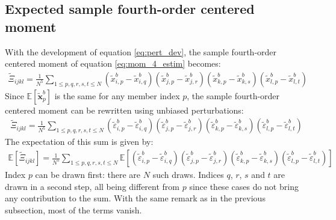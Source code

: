 \documentclass[12pt]{scrartcl}
\begin{document}
\subsection{Expected sample fourth-order centered moment}
With the development of equation \eqref{eq:pert_dev}, the sample fourth-order centered moment of equation \eqref{eq:mom_4_estim} becomes:
\begin{align}
\widetilde{\Xi}_{ijkl} = \frac{1}{N^5} \sum_{1 \le p,q,r,s,t \le N} \left(\widetilde{x}^b_{i,p} - \widetilde{x}^b_{i,q}\right) \left(\widetilde{x}^b_{j,p} - \widetilde{x}^b_{j,r}\right) \left(\widetilde{x}^b_{k,p} - \widetilde{x}^b_{k,s}\right) \left(\widetilde{x}^b_{l,p} - \widetilde{x}^b_{l,t}\right)
\end{align}
Since $\mathbb{E} \left[\widetilde{\mathbf{x}}^b_p\right]$ is the same for any member index $p$, the sample fourth-order centered moment can be rewritten using unbiased perturbations:
\begin{align}
\widetilde{\Xi}_{ijkl} = \frac{1}{N^5} \sum_{1 \le p,q,r,s,t \le N} \left(\widetilde{\varepsilon}^b_{i,p} - \widetilde{\varepsilon}^b_{i,q}\right) \left(\widetilde{\varepsilon}^b_{j,p} - \widetilde{\varepsilon}^b_{j,r}\right) \left(\widetilde{\varepsilon}^b_{k,p} - \widetilde{\varepsilon}^b_{k,s}\right) \left(\widetilde{\varepsilon}^b_{l,p} - \widetilde{\varepsilon}^b_{l,t}\right)
\end{align}
The expectation of this sum is given by:
\begin{align}
\mathbb{E} \left[\widetilde{\Xi}_{ijkl}\right] = \frac{1}{N^5} \sum_{1 \le p,q,r,s,t \le N} \mathbb{E} \left[\left(\widetilde{\varepsilon}^b_{i,p} - \widetilde{\varepsilon}^b_{i,q}\right) \left(\widetilde{\varepsilon}^b_{j,p} - \widetilde{\varepsilon}^b_{j,r}\right) \left(\widetilde{\varepsilon}^b_{k,p} - \widetilde{\varepsilon}^b_{k,s}\right) \left(\widetilde{\varepsilon}^b_{l,p} - \widetilde{\varepsilon}^b_{l,t}\right) \right]
\end{align}
Index $p$ can be drawn first: there are $N$ such draws. Indices $q$, $r$, $s$ and $t$ are drawn in a second step, all being different from $p$ since these cases do not bring any contribution to the sum. With the same remark as in the previous subsection, most of the terms vanish.
\end{document}
